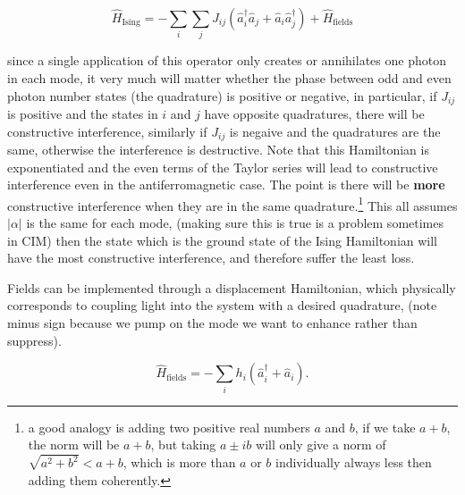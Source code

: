 \documentclass[english]{article}
\begin{document}
\begin{equation}
\hat{H}_\mathrm{Ising}=-\sum_i\sum_jJ_{ij}(\hat{a}^\dagger_i\hat{a}_j+\hat{a}_i\hat{a}^\dagger_j)+\hat{H}_\mathrm{fields}
\end{equation}

since a single application of this operator only creates or annihilates one photon in each mode,  it very much will matter whether the phase between odd and even photon number states (the quadrature) is positive or negative,  in particular,  if $J_{ij}$ is positive and the states in $i$ and $j$ have opposite quadratures, there will be constructive interference,  similarly if $J_{ij}$ is negaive and the quadratures are the same,  otherwise the interference is destructive.  Note that this Hamiltonian is exponentiated and the even terms of the Taylor series will lead to constructive interference even in the antiferromagnetic case.  The point is there will be \textbf{more} constructive interference when they are in the same quadrature.\footnote{a good analogy is adding two positive real numbers $a$ and $b$,  if we take $a+b$, the norm will be $a+b$,  but taking $a\pm ib$ will only give a norm of $\sqrt{a^2+b^2}<a+b$,  which is more than $a$ or $b$ individually always less then adding them coherently.}  This all assumes $|\alpha|$ is the same for each mode,  (making sure this is true is a problem sometimes in CIM) then the state which is the ground state of the Ising Hamiltonian will have the most constructive interference, and therefore suffer the least loss. 

Fields can be implemented through a displacement Hamiltonian, which physically corresponds to coupling light into the system with a desired quadrature,  (note minus sign because we pump on the mode we want to enhance rather than suppress).

\begin{equation}
\hat{H}_\mathrm{fields}=-\sum_ih_i(\hat{a}^\dagger_i+\hat{a}_i).
\end{equation}
\end{document}
